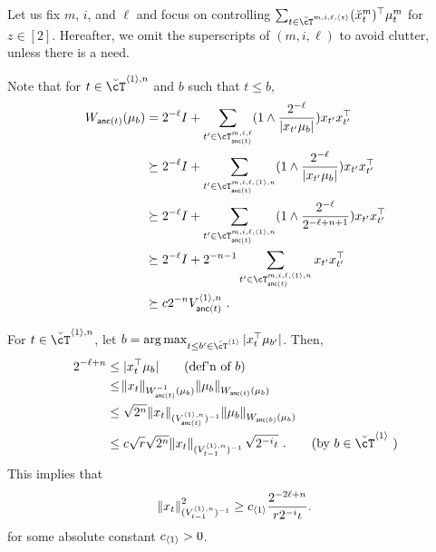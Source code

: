 Let us fix $m$, $i$, and $\ell$ and focus on controlling $\sum_{t \in \brcT^{m,i,\ell,\la z\ra}} (\brx_{t}^m)^\top \mu_{t}^m $ for $z\in[2]$.
Hereafter, we omit the superscripts of $(m,i,\ell)$ to avoid clutter, unless there is a need. 

Note that for $t  \in \brcT^{\la1\ra,n}$ and $b$ such that $t \le b$, 
\begin{align*}
  W_{\anc(t)}(\mu_b)
  &= 2^{-\ell} I +  \sum_{t' \in \cT^{m,i,\ell}_{\anc(t)}} (1\wedge \fr{2^{-\ell} }{|x_{t'} \mu_b | } )   x_{t'} x_{t'}^\T
  \\&\succeq 2^{-\ell} I +  \sum_{t' \in \cT^{m,i,\ell,\la1\ra,n}_{\anc(t)}  } (1\wedge \fr{2^{-\ell} }{|x_{t'} \mu_b | } )   x_{t'} x_{t'}^\T
  \\&\succeq 2^{-\ell} I +  \sum_{t' \in \cT^{m,i,\ell,\la1\ra,n}_{\anc(t)}  } (1\wedge \fr{2^{-\ell} }{2^{-\ell+n+1} } )   x_{t'} x_{t'}^\T
  \\&\succeq 2^{-\ell} I +  2^{-n-1} \sum_{t' \in \cT^{m,i,\ell,\la1\ra,n}_{\anc(t)} } x_{t'} x_{t'}^\T
  \\&\succeq c2^{-n} V^{\la1\ra,n}_{\anc(t)}~.
\end{align*}

For $t  \in \brcT^{\la1\ra,n}$, let $b = \arg \max_{t \le b'\in \brcT^{\la1\ra} } |x_{t}^\top \mu_{b'}|$.
Then,
\begin{align*}
  2^{-\ell + n} 
  &\le |x_{t}^\top \mu_{b}| \tag{def'n of $b$}
  \\&\le \norm{x_{t}}_{W_{\anc(t)}^{-1}(\mu_{b})}  \norm{\mu_b}_{W_{\anc(t)}(\mu_b)}  
  \\&\le \sqrt{2^n} \norm{x_{t}}_{(V^{\la1\ra,n}_{\anc(t)})^{-1}}  \norm{\mu_{b}}_{W_{\anc(b)}(\mu_b)}   
  \\&\le c\sqrt{r} \sqrt{2^n} \norm{x_{t}}_{(V^{\la1\ra,n}_{t-1})^{-1}}  \sqrt{2^{-i}\iota} ~.  \tag{by $b \in \brcT^{\la1\ra}$  }
\end{align*}
This implies that
\begin{align*}
  \norm{x_{t}}_{(V^{{\langle}1{\rangle},n}_{t-1})^{-1}}^2  \ge c_{{\langle}1{\rangle}} { \frac{2^{-2\ell+n}}{r 2^{-i}\iota} }. 
\end{align*}
for some absolute constant $c_{{\langle}1{\rangle}} > 0$.

